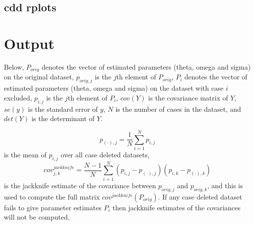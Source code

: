 \subsection{cdd rplots}
\newcommand{\rplotsconditions}{
If option -rplots is set $>=1$, a plot with Covariance ratios
vs Cook scores for each case, e.g. ID, will be generated. 
The default cdd rplots template 
requires no special R libraries.
If no pdf is generated,
see the .Rout file in the main run directory for error messages.}


\section{Output}

Below, $P_{orig}$ denotes the vector of estimated parameters (theta, omega and sigma)
on the original dataset, $p_{orig,j}$ is the $j$th element of $P_{orig}$,
$P_{i}$ denotes the vector of estimated parameters (theta, omega and sigma)
on the dataset with case $i$ excluded, $p_{i,j}$ is the $j$th element of $P_{i}$,
$cov(Y)$ is the covariance matrix of $Y$,
$se(y)$ is the standard error of $y$,
$N$ is the number of cases in the dataset,
and
$det(Y)$ is the determinant of $Y$.

\[
p_{(\cdot),j}=\frac{1}{N}\sum_{i=1}^{N}p_{i,j} 
\]
is the mean of $p_{i,j}$ over all case deleted datasets, 
\[
cov^{jackknife}_{j,k} = \frac{N-1}{N}\sum_{i=1}^{N}\left(p_{i,j}-p_{(\cdot),j}\right)\left(p_{i,k}-p_{(\cdot),k}\right)
\]
is the jackknife estimate of the covariance between $p_{orig,j}$ and $p_{orig,k}$, and this is used
to compute the full matrix
$cov^{jackknife}(P_{orig})$. If any case deleted dataset fails to give parameter estimates $P_{i}$ then
jackknife estimates of the covariances will not be computed.


